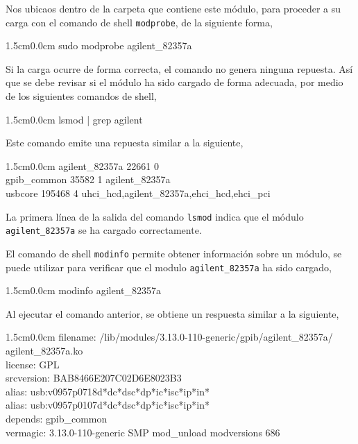 \documentclass[paper=letter,oneside,fontsize=11pt, parskip=full]{scrartcl}
\newenvironment{code}
	{\begin{adjustwidth}{1.5cm}{0.0cm}\ttfamily}
	{\end{adjustwidth}}
\begin{document}
		Nos ubicaos dentro de la carpeta que contiene este módulo, para proceder a su carga con el comando de shell \texttt{modprobe}, de la siguiente forma,
		
		\begin{code}
			sudo modprobe agilent\_82357a
		\end{code}
		
		Si la carga ocurre de forma correcta, el comando no genera ninguna repuesta. Así que se debe revisar si el módulo ha sido cargado de forma adecuada, por medio de los siguientes comandos de shell,
		
		\begin{code}		
			lsmod | grep agilent
		\end{code}
	
		Este comando emite una repuesta similar a la siguiente,

		\begin{code}
			agilent\_82357a	22661  0 \\				
			gpib\_common	35582  1 agilent\_82357a  \\				
			usbcore	195468  4 uhci\_hcd,agilent\_82357a,ehci\_hcd,ehci\_pci \\
		\end{code}
		
		La primera línea de la salida del comando \texttt{lsmod} indica que el módulo \texttt{agilent\_82357a} se ha cargado correctamente. 	
		
		El comando de shell \texttt{modinfo} permite obtener información sobre un módulo, se puede utilizar para verificar que el modulo \texttt{agilent\_82357a} ha sido cargado, 
		
		\begin{code}
			modinfo agilent\_82357a 			
		\end{code}
		
		Al ejecutar el comando anterior, se obtiene un respuesta similar a la siguiente,
		
		\begin{code}
			filename:    /lib/modules/3.13.0-110-generic/gpib/agilent\_82357a/ \\ agilent\_82357a.ko \\
			license:        GPL \\
			srcversion:     BAB8466E207C02D6E8023B3 \\
			alias:          usb:v0957p0718d*dc*dsc*dp*ic*isc*ip*in* \\
			alias:          usb:v0957p0107d*dc*dsc*dp*ic*isc*ip*in* \\
			depends:        gpib\_common \\
			vermagic:       3.13.0-110-generic SMP mod\_unload  modversions 686 
		\end{code}
	
\end{document}
